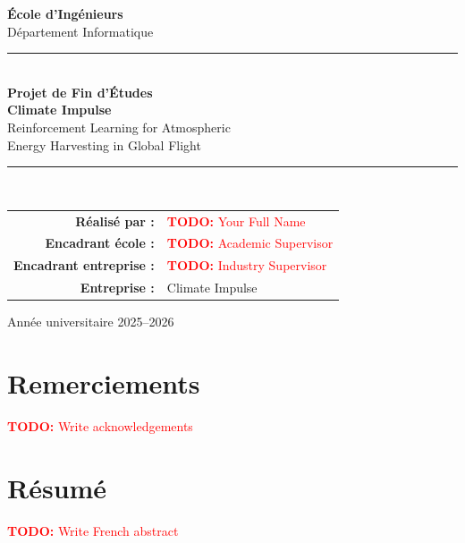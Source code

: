\documentclass[a4paper, 12pt, oneside]{report}
\newcommand{\todo}[1]{\textcolor{red}{\textbf{TODO:} #1}}
\newcommand{\projectname}{Climate Impulse}
\begin{document}
\begin{titlepage}
  \centering
  \vspace*{1cm}


  \vspace{1.5cm}

  {\Large\textbf{École d'Ingénieurs}}\\[0.3cm]  %
  {\large Département Informatique}\\[2cm]

  \rule{\textwidth}{1.5pt}\\[0.4cm]
  {\Huge\bfseries Projet de Fin d'Études}\\[0.3cm]
  {\LARGE\bfseries \projectname}\\[0.2cm]
  {\Large Reinforcement Learning for Atmospheric\\Energy Harvesting in Global Flight}\\[0.4cm]
  \rule{\textwidth}{1.5pt}\\[2cm]

  {\large
    \begin{tabular}{rl}
      \textbf{Réalisé par :}    & \todo{Your Full Name} \\[0.3cm]
      \textbf{Encadrant école :} & \todo{Academic Supervisor} \\[0.3cm]
      \textbf{Encadrant entreprise :} & \todo{Industry Supervisor} \\[0.3cm]
      \textbf{Entreprise :}     & Climate Impulse \\[0.3cm]
    \end{tabular}
  }

  \vfill

  {\large Année universitaire 2025--2026}

\end{titlepage}


\chapter*{Remerciements}
\todo{Write acknowledgements}

\chapter*{Résumé}
\todo{Write French abstract}
\end{document}
